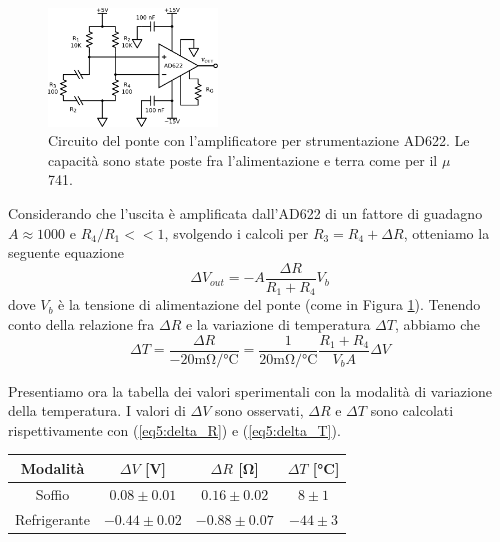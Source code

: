 \begin{figure}
  \begin{center}
    \includegraphics[width=0.40\textwidth]{../E05/latex/c_func_INA.pdf}
  \end{center}
  \caption{Circuito del ponte con l'amplificatore per strumentazione AD622. Le capacità sono state poste fra l'alimentazione e terra come per il $\mu$741.}
  \label{cir5:ad622_ponte}
\end{figure}

Considerando che l'uscita è amplificata dall'AD622 di un fattore di guadagno $A \approx 1000$ e $R_4/R_1<<1$, svolgendo i calcoli per $R_3=R_4+\Delta R$, otteniamo la seguente equazione
\begin{equation}
\Delta V_{out} = - A \frac{\Delta R}{R_1+R_4} V_{b}
\label{eq5:delta_R}
\end{equation}
dove $V_{b}$ è la tensione di alimentazione del ponte (come in Figura \ref{cir5:ad622_ponte}). Tenendo conto della relazione fra $\Delta R$ e la variazione di temperatura $\Delta T$, abbiamo che
\begin{equation}
\Delta T = \frac{\Delta R}{- 20 \si{\milli\ohm/\celsius}} = \frac{1}{20 \si{\milli\ohm/\celsius}} \frac{R_1+R_4}{V_b A} \Delta V
\label{eq5:delta_T}
\end{equation}

Presentiamo ora la tabella dei valori sperimentali con la modalità di variazione della temperatura. I valori di $\Delta V$ sono osservati, $\Delta R$ e $\Delta T$ sono calcolati rispettivamente con (\ref{eq5:delta_R}) e (\ref{eq5:delta_T}).

{\renewcommand{\arraystretch}{1.2}%
	\begin{tabular}{c|c|c|c}
	Modalità & $\Delta V$ [\si{\volt}] & $\Delta R$ [\si{\ohm}] & $\Delta T$ [\si{\celsius}]\\
    \hline
	Soffio & $0.08\pm0.01 $ & $0.16\pm0.02$ & $8 \pm 1$\\
    \hline
	Refrigerante & $-0.44\pm0.02 $ & $-0.88\pm0.07$ & $-44 \pm 3$\\
	\end{tabular}
}